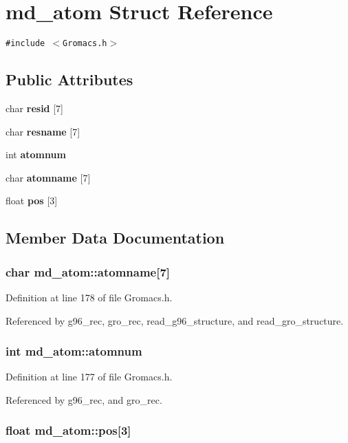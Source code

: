 \section{md\_\-atom  Struct Reference}
\label{structmd__atom}
{\tt \#include $<$Gromacs.h$>$}

\subsection*{Public Attributes}
\begin{CompactItemize}
\item 
char {\bf resid} [7]
\item 
char {\bf resname} [7]
\item 
int {\bf atomnum}
\item 
char {\bf atomname} [7]
\item 
float {\bf pos} [3]
\end{CompactItemize}


\subsection{Member Data Documentation}
\subsubsection{\setlength{\rightskip}{0pt plus 5cm}char md\_\-atom::atomname[7]}\label{structmd__atom_m3}




Definition at line 178 of file Gromacs.h.

Referenced by g96\_\-rec, gro\_\-rec, read\_\-g96\_\-structure, and read\_\-gro\_\-structure.
\subsubsection{\setlength{\rightskip}{0pt plus 5cm}int md\_\-atom::atomnum}\label{structmd__atom_m2}




Definition at line 177 of file Gromacs.h.

Referenced by g96\_\-rec, and gro\_\-rec.
\subsubsection{\setlength{\rightskip}{0pt plus 5cm}float md\_\-atom::pos[3]}\label{structmd__atom_m4}




